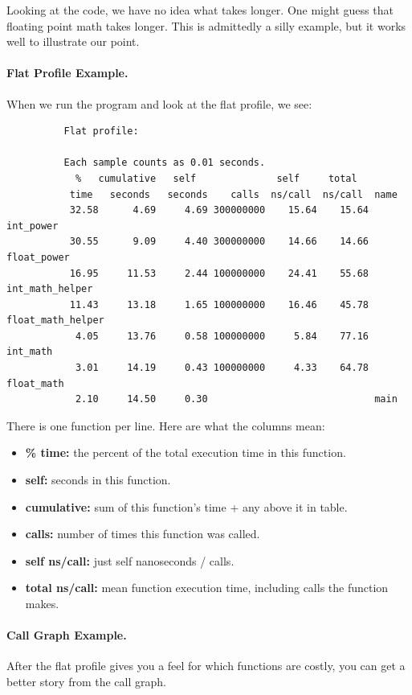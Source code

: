 \documentclass[a4paper]{report}
\begin{document}
Looking at the code, we have no idea what takes longer.
One might guess that floating point math takes longer. This is admittedly a
silly example, but it works well to illustrate our point.

\paragraph{Flat Profile Example.}
    When we run the program and look at the flat profile, we see:

  \begin{lstlisting}
          Flat profile:

          Each sample counts as 0.01 seconds.
            %   cumulative   self              self     total           
           time   seconds   seconds    calls  ns/call  ns/call  name    
           32.58      4.69     4.69 300000000    15.64    15.64  int_power
           30.55      9.09     4.40 300000000    14.66    14.66  float_power
           16.95     11.53     2.44 100000000    24.41    55.68  int_math_helper
           11.43     13.18     1.65 100000000    16.46    45.78  float_math_helper
            4.05     13.76     0.58 100000000     5.84    77.16  int_math
            3.01     14.19     0.43 100000000     4.33    64.78  float_math
            2.10     14.50     0.30                             main
  \end{lstlisting}

 There is one function per line. Here are what the columns mean:
  \begin{itemize}
    \item {\bf \% time:} the percent of the total execution time in this function.
    \item {\bf self:} seconds in this function.
    \item {\bf cumulative:} sum of this function's time + any above it in table.
    \item {\bf calls:} number of times this function was called.
    \item {\bf self ns/call:} just self nanoseconds / calls.
    \item {\bf total ns/call:} mean function execution time, including
       calls the function makes.
  \end{itemize}

\paragraph{Call Graph Example.}
After the flat profile gives you a feel for which functions are costly, you
      can get a better story from the call graph.
\end{document}
